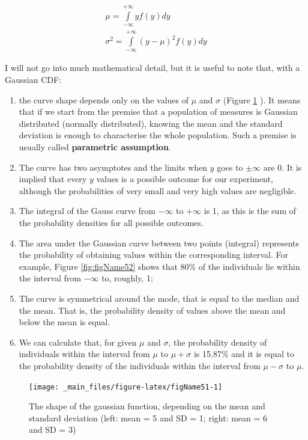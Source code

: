 \documentclass[a4paper,12pt,oneside]{book}
\providecommand{\tightlist}{%
  \setlength{\itemsep}{0pt}\setlength{\parskip}{0pt}}
\begin{document}
\[\begin{array}{l}
\mu  = \int\limits_{ - \infty }^{ + \infty } {y f(y)} dy \\ 
\sigma ^2  = \int\limits_{ - \infty }^{ + \infty } {\left( {y - \mu } \right)^2 f(y)} dy
\end{array}\]

I will not go into much mathematical detail, but it is useful to note that, with a Gaussian CDF:

\begin{enumerate}
\def\labelenumi{\arabic{enumi}.}
\tightlist
\item
  the curve shape depends only on the values of \(\mu\) and \(\sigma\) (Figure \ref{fig:figName51} ). It means that if we start from the premise that a population of measures is Gaussian distributed (normally distributed), knowing the mean and the standard deviation is enough to characterise the whole population. Such a premise is usually called \textbf{parametric assumption}.
\item
  The curve has two asymptotes and the limits when \(y\) goes to \(\pm \infty\) are 0. It is implied that every \(y\) values is a possible outcome for our experiment, although the probabilities of very small and very high values are negligible.
\item
  The integral of the Gauss curve from \(- \infty\) to \(+ \infty\) is 1, as this is the sum of the probability densities for all possible outcomes.
\item
  The area under the Gaussian curve between two points (integral) represents the probability of obtaining values within the corresponding interval. For example, Figure \ref{fig:figName52} shows that 80\% of the individuals lie within the interval from \(-\infty\) to, roughly, 1;
\item
  The curve is symmetrical around the mode, that is equal to the median and the mean. That is, the probability density of values above the mean and below the mean is equal.
\item
  We can calculate that, for given \(\mu\) and \(\sigma\), the probability density of individuals within the interval from \(\mu\) to \(\mu + \sigma\) is 15.87\% and it is equal to the probability density of the individuals within the interval from \(\mu - \sigma\) to \(\mu\).
\end{enumerate}

\begin{figure}

{\centering \texttt{[image: \_main\_files/figure-latex/figName51-1]} 

}

\caption{The shape of the gaussian function, depending on the mean and standard deviation (left: mean = 5 and SD = 1; right: mean = 6 and SD = 3)}\label{fig:figName51}
\end{figure}
\end{document}
